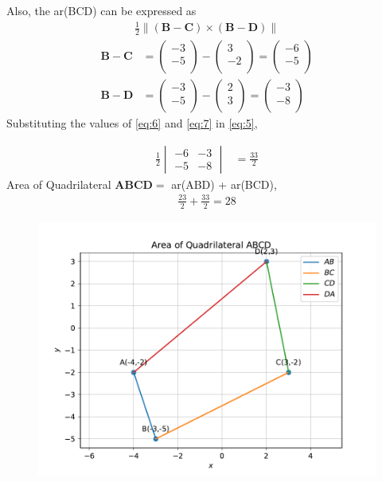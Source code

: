 \documentclass[12pt]{article}
\newcommand{\mydet}[1]{\ensuremath{\begin{vmatrix}#1\end{vmatrix}}}
\providecommand{\brak}[1]{\ensuremath{\left(#1\right)}}
\providecommand{\norm}[1]{\left\lVert#1\right\rVert}
\newcommand{\myvec}[1]{\ensuremath{\begin{pmatrix}#1\end{pmatrix}}}
\let\vec\mathbf
\begin{document}
\begin{enumerate}
		Also, the ar(BCD) can be expressed as
  \begin{align}
  \frac{1}{2} \norm{\brak{\vec{B}-\vec{C}}  \times 
   \brak{\vec{B}- \vec{D}}} \label{eq:5}
\end{align}
\begin{align}
	\vec{B}- \vec{C} &= \myvec{-3\\-5\\}-\myvec{3\\-2\\}=\myvec{-6\\-5\\}\label{eq:6} \\
	  \vec{B}- \vec{D} &= \myvec{-3\\-5\\}-\myvec{2\\3\\}=\myvec{-3\\-8\\}\label{eq:7} 
  \end{align}
		Substituting the values of \eqref{eq:6} and \eqref{eq:7} in \eqref{eq:5},

		\begin{align}
	\frac{1}{2}\mydet{-6 & -3\\-5 & -8}  
	&=	\frac{33}{2}
\end{align}
		Area of Quadrilateral $\vec{A}\vec{B}\vec{C}\vec{D} = $ ar(ABD) +  ar(BCD),
\begin{align}
	\frac{23}{2}+\frac{33}{2} = 28
\end{align}
\begin{figure}[!h]
 \begin{center}
  \includegraphics[width=\columnwidth]{figs/fig.pdf}
 \end{center}
\caption{}
\label{fig:Fig1}
\end{figure}
\end{enumerate}
\end{document}

